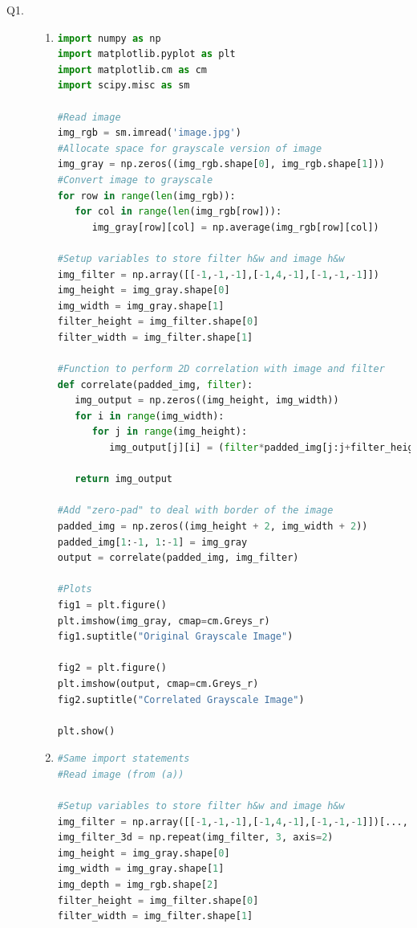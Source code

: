 \documentclass{csc_assignment4}
\begin{document}
\begin{description}

\item[Q1.]
\begin{enumerate}[label=(\alph*)]
\item
\begin{lstlisting}[language=Python]
import numpy as np
import matplotlib.pyplot as plt
import matplotlib.cm as cm
import scipy.misc as sm

#Read image
img_rgb = sm.imread('image.jpg')
#Allocate space for grayscale version of image
img_gray = np.zeros((img_rgb.shape[0], img_rgb.shape[1]))
#Convert image to grayscale
for row in range(len(img_rgb)):
   for col in range(len(img_rgb[row])):
      img_gray[row][col] = np.average(img_rgb[row][col])

#Setup variables to store filter h&w and image h&w
img_filter = np.array([[-1,-1,-1],[-1,4,-1],[-1,-1,-1]])
img_height = img_gray.shape[0]
img_width = img_gray.shape[1]
filter_height = img_filter.shape[0]
filter_width = img_filter.shape[1]

#Function to perform 2D correlation with image and filter
def correlate(padded_img, filter):
   img_output = np.zeros((img_height, img_width))
   for i in range(img_width):
      for j in range(img_height):
         img_output[j][i] = (filter*padded_img[j:j+filter_height, i:i+filter_width]).sum()

   return img_output

#Add "zero-pad" to deal with border of the image
padded_img = np.zeros((img_height + 2, img_width + 2))   
padded_img[1:-1, 1:-1] = img_gray
output = correlate(padded_img, img_filter)

#Plots
fig1 = plt.figure()
plt.imshow(img_gray, cmap=cm.Greys_r)
fig1.suptitle("Original Grayscale Image")

fig2 = plt.figure()
plt.imshow(output, cmap=cm.Greys_r)
fig2.suptitle("Correlated Grayscale Image")

plt.show()
\end{lstlisting}

\item   
\begin{lstlisting}[language=Python]
#Same import statements
#Read image (from (a))

#Setup variables to store filter h&w and image h&w
img_filter = np.array([[-1,-1,-1],[-1,4,-1],[-1,-1,-1]])[..., None]
img_filter_3d = np.repeat(img_filter, 3, axis=2)
img_height = img_gray.shape[0]
img_width = img_gray.shape[1]
img_depth = img_rgb.shape[2]
filter_height = img_filter.shape[0]
filter_width = img_filter.shape[1]


\end{lstlisting}
\end{enumerate}
\end{description}
\end{document}
